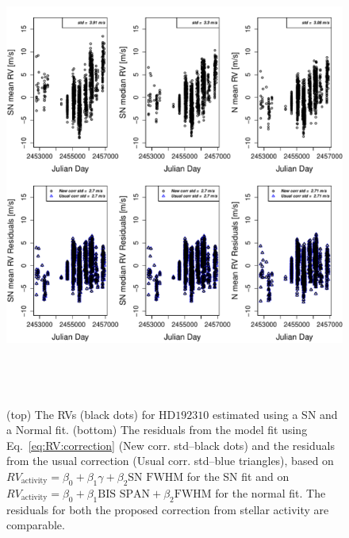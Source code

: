 \documentclass{aa}
\begin{document}
\begin{figure} 
\begin{center}
\includegraphics[height = 6in]{NEW_CORRECTIONHD19231_[3]CorrectionActivity_RadialVelocity_vs_time.pdf} 
   \caption{(top) The RVs (black dots) for $\text{HD}192310$ estimated using a SN and a Normal fit.
 (bottom) The residuals from the model fit using Eq.~\eqref{eq:RV:correction} (New corr. std--black dots) and the residuals from the usual correction (Usual corr. std--blue triangles), based on $RV_{\text{activity}}=\beta_0+\beta_1 \gamma + \beta_2 \text{SN FWHM}$ for the SN fit and on $RV_{\text{activity}}=\beta_0+\beta_1 \text{BIS SPAN} + \beta_2 \text{FWHM}$ for the normal fit. The residuals for both the proposed correction from stellar activity are comparable.
 }
   \label{fig:HD192310:correctionRV}
\end{center}
\end{figure}
\end{document}
